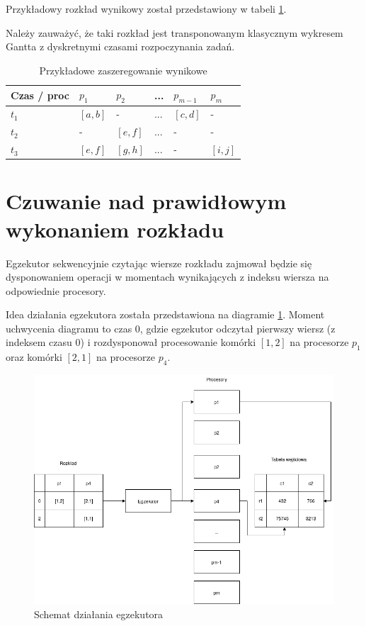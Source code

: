 \documentclass[brudnopis]{xmgr}
\begin{document}
Przykładowy rozkład wynikowy został przedstawiony w tabeli \ref{tab:example-sched-out}.

Należy zauważyć, że taki rozkład jest transponowanym klasycznym wykresem Gantta z dyskretnymi czasami rozpoczynania zadań.

\begin{table}[!tbh]
\begin{tabular}{|l|l|l|l|l|l|} \hline
Czas / proc & $p_1$     & $p_2$     & ...   & $p_{m-1}$ & $p_{m}$ \\ \hline
$t_1$       & $[a,b]$   & -         & ...   & $[c,d]$   & - \\ \hline
$t_2$       & -         & $[e,f]$   & ...   & -         & - \\ \hline
$t_3$       & $[e,f]$   & $[g,h]$   & ...   & -         & $[i,j]$\\ \hline
\end{tabular}
\caption{Przykładowe zaszeregowanie wynikowe\label{tab:example-sched-out}}
\end{table}

\section{Czuwanie nad prawidłowym wykonaniem rozkładu}

Egzekutor sekwencyjnie czytając wiersze rozkładu zajmował będzie się dysponowaniem operacji w momentach wynikających z indeksu wiersza na odpowiednie procesory.

Idea działania egzekutora została przedstawiona na diagramie \ref{diag:executor}. Moment uchwycenia diagramu 
to czas 0, gdzie egzekutor odczytał pierwszy wiersz (z indeksem czasu 0) i rozdysponował procesowanie komórki $[1,2]$ na procesorze $p_1$ oraz komórki $[2,1]$ na procesorze $p_4$.

\begin{figure}[!tbh]
\centering
\includegraphics[width=.8\hsize]{fig/executor.png}
\caption{Schemat działania egzekutora\label{diag:executor}}
\end{figure}
\end{document}
